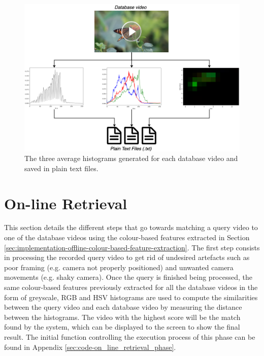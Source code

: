 \begin{figure}[h] 
\centerline{\includegraphics[width=\textwidth]{figures/implementation/all_avg_norm_histograms.png}}
\caption{\label{fig:implementation-all_avg_norm_histograms}The three average histograms generated for each database video and saved in plain text files.}
\end{figure}


\section{On-line Retrieval}

This section details the different steps that go towards matching a query video to one of the database videos using the colour-based features extracted in Section \ref{sec:implementation-offline-colour-based-feature-extraction}. The first step consists in processing the recorded query video to get rid of undesired artefacts such as poor framing (e.g. camera not properly positioned) and unwanted camera movements (e.g. shaky camera). Once the query is finished being processed, the same colour-based features previously extracted for all the database videos in the form of greyscale, RGB and HSV histograms are used to compute the similarities between the query video and each database video by measuring the distance between the histograms. The video with the highest score will be the match found by the system, which can be displayed to the screen to show the final result. The initial function controlling the execution process of this phase can be found in Appendix \ref{sec:code-on_line_retrieval_phase}.

